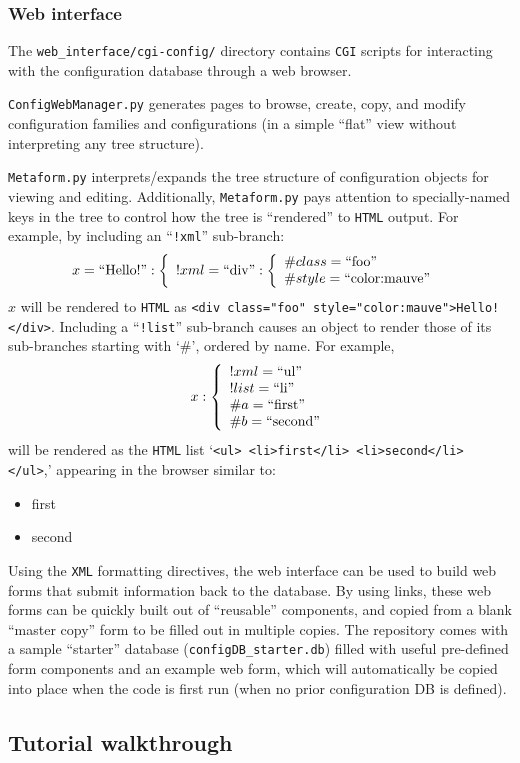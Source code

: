 \documentclass[12pt,english]{article}
\newcommand{\cd}[1]{\texttt{#1}}
\begin{document}
%
\subsubsection{Web interface}

The \cd{web\_interface/cgi-config/} directory contains \cd{CGI} scripts for interacting with the configuration database through a web browser.

\cd{ConfigWebManager.py} generates pages to browse, create, copy, and modify configuration families and configurations (in a simple ``flat'' view without interpreting any tree structure).

\cd{Metaform.py} interprets/expands the tree structure of configuration objects for viewing and editing.
Additionally, \cd{Metaform.py} pays attention to specially-named keys in the tree to control how the tree is ``rendered'' to \cd{HTML} output.
For example, by including an ``\cd{!xml}'' sub-branch:
\[ x = \textrm{``Hello!''}:  \left\{ \begin{array}{l} !xml = \textrm{``div''}: \left\{ \begin{array}{l} \#class = \textrm{``foo''} \\ \#style = \textrm{``color:mauve''}  \end{array} \right.  \end{array} \right.\]
$x$ will be rendered to \cd{HTML} as \verb#<div class="foo" style="color:mauve">Hello!</div>#.
Including a ``\cd{!list}'' sub-branch causes an object to render those of its sub-branches starting with `\#', ordered by name.
For example,
\[ x: \left\{ \begin{array}{l} !xml = \textrm{``ul''} \\ !list = \textrm{``li''} \\ \#a = \textrm{``first''} \\ \#b = \textrm{``second''}  \end{array} \right.\]
will be rendered as the \cd{HTML} list `\verb#<ul> <li>first</li> <li>second</li> </ul>#,' appearing in the browser similar to:
\begin{itemize}
\item first
\item second
\end{itemize}
Using the \cd{XML} formatting directives, the web interface can be used to build web forms that submit information back to the database.
By using links, these web forms can be quickly built out of ``reusable'' components,
	and copied from a blank ``master copy'' form to be filled out in multiple copies.
The repository comes with a sample ``starter'' database (\cd{configDB\_starter.db})
	filled with useful pre-defined form components and an example web form,
	which will automatically be copied into place when the code is first run (when no prior configuration DB is defined).

%
%
\subsection{Tutorial walkthrough}
\end{document}
